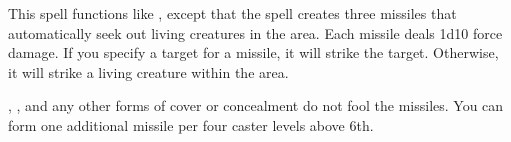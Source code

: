 \spellrng{\rngmed}
\begin{spelleffect}
  This spell functions like , except that the spell creates three missiles that automatically seek out living creatures in the area. Each missile deals 1d10 force damage. If you specify a target for a missile, it will strike the target. Otherwise, it will strike a living creature within the area.
  
  , , and any other forms of cover or concealment do not fool the missiles. You can form one additional missile per four caster levels above 6th.
\end{spelleffect}


